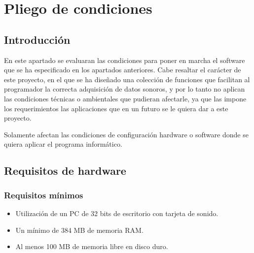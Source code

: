 %
%
%
% 
%
%
%
%

\chapter{Pliego de condiciones}
\label{cha:pliego-de-condiciones}

\section{Introducción}

En este apartado se evaluaran las condiciones para poner en marcha el software que se ha especificado en los apartados anteriores. Cabe resaltar el carácter de este proyecto, en el que se ha diseñado una colección de funciones que facilitan al programador la correcta adquisición de datos sonoros, y por lo tanto no aplican las condiciones técnicas o ambientales que pudieran afectarle, ya que las impone los requerimientos las aplicaciones que en un futuro se le quiera dar a este proyecto.

Solamente afectan las condiciones de configuración hardware o software donde se quiera aplicar el programa informático.

\section{Requisitos de hardware}

\subsection{Requisitos mínimos}
\begin{itemize}
  \item Utilización de un PC de 32 bits de escritorio con tarjeta de sonido.
  \item Un mínimo de 384 MB de memoria RAM.
  \item Al menos 100 MB de memoria libre en disco duro.
\end{itemize}

